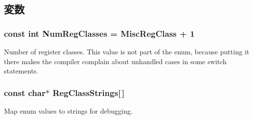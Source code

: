 \subsection{変数}
\hypertarget{reg__class_8hh_a361ac27e5356875b7edf8d5bbe83635a}{
\subsubsection[{NumRegClasses}]{\setlength{\rightskip}{0pt plus 5cm}const int {\bf NumRegClasses} = MiscRegClass + 1}}
\label{reg__class_8hh_a361ac27e5356875b7edf8d5bbe83635a}
Number of register classes. This value is not part of the enum, because putting it there makes the compiler complain about unhandled cases in some switch statements. \hypertarget{reg__class_8hh_abd784c3d8b8c0aa741f47934de24f1fd}{
\subsubsection[{RegClassStrings}]{\setlength{\rightskip}{0pt plus 5cm}const char$\ast$ {\bf RegClassStrings}\mbox{[}$\,$\mbox{]}}}
\label{reg__class_8hh_abd784c3d8b8c0aa741f47934de24f1fd}


Map enum values to strings for debugging. 